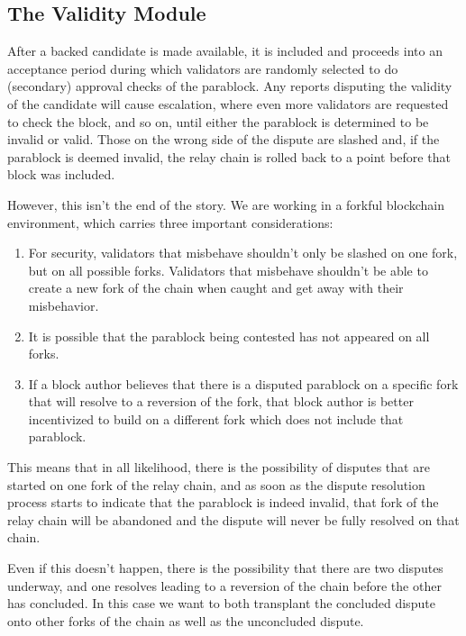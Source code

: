 \subsection{The Validity Module}

After a backed candidate is made available, it is included and proceeds into an
acceptance period during which validators are randomly selected to do
(secondary) approval checks of the parablock. Any reports disputing the validity
of the candidate will cause escalation, where even more validators are requested
to check the block, and so on, until either the parablock is determined to be
invalid or valid. Those on the wrong side of the dispute are slashed and, if the
parablock is deemed invalid, the relay chain is rolled back to a point before
that block was included.
\newline

However, this isn't the end of the story. We are working in a forkful blockchain
environment, which carries three important considerations:

\begin{enumerate}
    \item For security, validators that misbehave shouldn't only be slashed on
    one fork, but on all possible forks. Validators that misbehave shouldn't be
    able to create a new fork of the chain when caught and get away with their
    misbehavior.
    \item It is possible that the parablock being contested has not appeared on
    all forks.
    \item If a block author believes that there is a disputed parablock on a
    specific fork that will resolve to a reversion of the fork, that block
    author is better incentivized to build on a different fork which does not
    include that parablock.
\end{enumerate}

This means that in all likelihood, there is the possibility of disputes that are
started on one fork of the relay chain, and as soon as the dispute resolution
process starts to indicate that the parablock is indeed invalid, that fork of
the relay chain will be abandoned and the dispute will never be fully resolved
on that chain.
\newline

Even if this doesn't happen, there is the possibility that there are two
disputes underway, and one resolves leading to a reversion of the chain before
the other has concluded. In this case we want to both transplant the concluded
dispute onto other forks of the chain as well as the unconcluded dispute.
\newline


